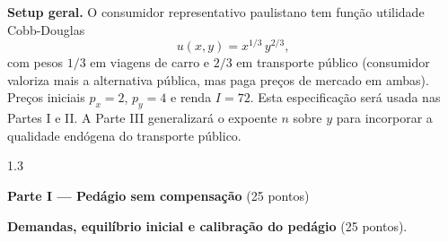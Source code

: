 \documentclass[11pt,addpoints]{exam}
\begin{document}
\vspace{0.5em}

\noindent\textbf{Setup geral.} O consumidor representativo paulistano tem função utilidade Cobb-Douglas
\[
   u(x,y) = x^{1/3}\, y^{2/3},
\]
com pesos $1/3$ em viagens de carro e $2/3$ em transporte público (consumidor valoriza mais a alternativa pública, mas paga preços de mercado em ambas). Preços iniciais $p_x = 2$, $p_y = 4$ e renda $I = 72$. Esta especificação será usada nas Partes I e II. A Parte III generalizará o expoente $n$ sobre $y$ para incorporar a qualidade endógena do transporte público.

\begin{spacing}{1.3}

\begin{center}\large\textbf{Parte I --- Pedágio sem compensação} \quad (25 pontos)\end{center}

\begin{questions}
\question \textbf{Demandas, equilíbrio inicial e calibração do pedágio} (25 pontos).

\end{questions}
\end{spacing}
\end{document}
